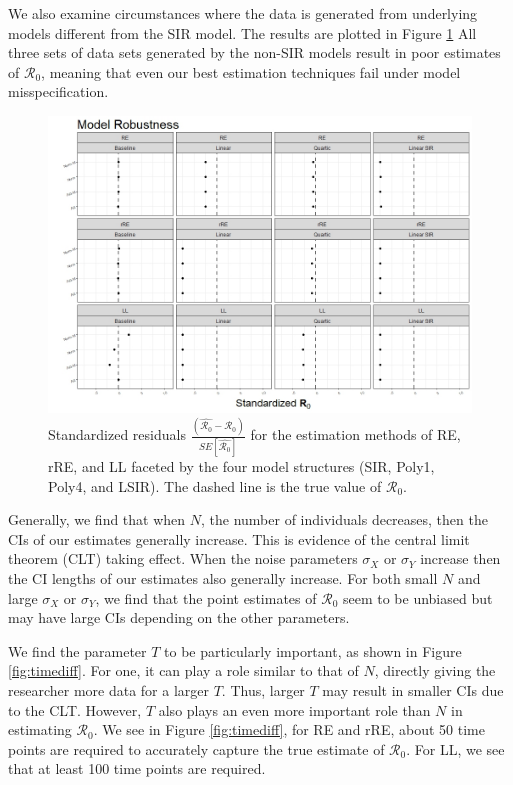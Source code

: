 \documentclass[12pt]{article}
\newcommand{\rr}{\ensuremath{\mathcal{R}_0}}
\begin{document}
We also examine circumstances where the data is generated from underlying models different from the SIR model.  The results are plotted in Figure \ref{fig:mod-rob}  All three sets of data sets generated by the non-SIR models result in poor estimates of $\rr$, meaning that even our best estimation techniques fail under model misspecification.

\begin{figure}[H]
	\centering
	\includegraphics[scale=0.5]{images/model_robust.jpeg}
	\caption{Standardized residuals $\frac{\left ( \hat{\rr} - \rr\right ) }{SE \left [\hat{\rr}\right ]}$ for the estimation methods of RE, rRE, and LL faceted by the four model structures (SIR, Poly1, Poly4, and LSIR).  The dashed line is the true value of $\rr$.}\label{fig:mod-rob}
\end{figure}


Generally, we find that when $N$, the number of individuals decreases, then the CIs of our estimates generally increase.  This is evidence of the  central limit theorem (CLT) taking effect.   When the noise parameters $\sigma_X$ or $\sigma_Y$ increase then the CI lengths of our estimates also generally increase.  For both small $N$ and large $\sigma_X$ or $\sigma_Y$, we find that the point estimates of $\rr$ seem to be unbiased but may have large CIs depending on the other parameters.

We find the parameter $T$ to be particularly important, as shown in Figure \ref{fig:timediff}.  For one, it can play a role similar to that of $N$, directly giving the researcher more data for a larger $T$.  Thus, larger $T$ may result in smaller CIs due to the CLT.  However, $T$ also plays an even more important role than $N$ in estimating $\rr$.  We see in Figure \ref{fig:timediff}, for RE and rRE, about 50 time points are required to accurately capture the true estimate of $\rr$.  For LL, we see that at least 100 time points are required.
\end{document}
